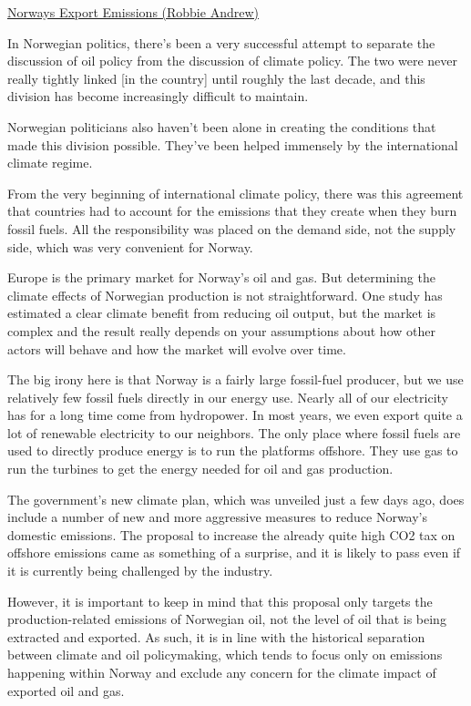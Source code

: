 \documentclass[
]{book}
\begin{document}
\href{https://folk.universitetetioslo.no/roberan/t/export_emissions.shtml}{Norways Export Emissions (Robbie Andrew)}

In Norwegian politics, there's been a very successful attempt to separate the discussion of oil policy from the discussion of climate policy. The two were never really tightly linked {[}in the country{]} until roughly the last decade, and this division has become increasingly difficult to maintain.

Norwegian politicians also haven't been alone in creating the conditions that made this division possible. They've been helped immensely by the international climate regime.

From the very beginning of international climate policy, there was this agreement that countries had to account for the emissions that they create when they burn fossil fuels. All the responsibility was placed on the demand side, not the supply side, which was very convenient for Norway.

Europe is the primary market for Norway's oil and gas. But determining the climate effects of Norwegian production is not straightforward. One study has estimated a clear climate benefit from reducing oil output, but the market is complex and the result really depends on your assumptions about how other actors will behave and how the market will evolve over time.

The big irony here is that Norway is a fairly large fossil-fuel producer, but we use relatively few fossil fuels directly in our energy use. Nearly all of our electricity has for a long time come from hydropower. In most years, we even export quite a lot of renewable electricity to our neighbors.
The only place where fossil fuels are used to directly produce energy is to run the platforms offshore. They use gas to run the turbines to get the energy needed for oil and gas production.

The government's new climate plan, which was unveiled just a few days ago, does include a number of new and more aggressive measures to reduce Norway's domestic emissions. The proposal to increase the already quite high CO2 tax on offshore emissions came as something of a surprise, and it is likely to pass even if it is currently being challenged by the industry.

However, it is important to keep in mind that this proposal only targets the production-related emissions of Norwegian oil, not the level of oil that is being extracted and exported. As such, it is in line with the historical separation between climate and oil policymaking, which tends to focus only on emissions happening within Norway and exclude any concern for the climate impact of exported oil and gas.
\end{document}
